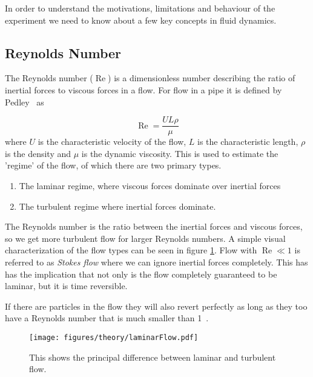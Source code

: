 
In order to understand the motivations, limitations and behaviour of the experiment we need to know about a few key concepts in fluid dynamics.



\subsection{Reynolds Number}
The Reynolds number ($\operatorname{Re}$) is a dimensionless number describing the ratio of inertial forces to viscous forces in a flow. For flow in a pipe it is defined by Pedley~\cite{introfluid} as


\begin{equation}\label{eq:reynolds}
\operatorname{Re} = \frac{U L \rho}{\mu}
\end{equation}
where $U$ is the characteristic velocity of the flow, $L$ is the characteristic length, $\rho$ is the density and $\mu$ is the dynamic viscosity. This is used to estimate the 'regime' of the flow, of which there are two primary types. 
\begin{enumerate}
\item The laminar regime, where viscous forces dominate over inertial forces
\item The turbulent regime where inertial forces dominate.
\end{enumerate}

The Reynolds number is the ratio between the inertial forces and viscous forces, so we get more turbulent flow for larger 
Reynolds numbers. A simple visual characterization of the flow types can be seen in figure \ref{fig:laminar_flow}. 
 Flow with $\operatorname{Re}\ll 1$ is referred to as \emph{Stokes flow} where we can ignore inertial forces completely. This has has the implication that not only is the flow completely guaranteed to be laminar, but it is time reversible. 
 
 If there are particles in the flow they will also revert perfectly as long as they too have a Reynolds number that is much smaller than 1~\cite{introfluid3}. 

\begin{figure}[H]
\centering
\texttt{[image: figures/theory/laminarFlow.pdf]}
\caption{This shows the principal difference between laminar and turbulent flow.}
\label{fig:laminar_flow}
\end{figure}


